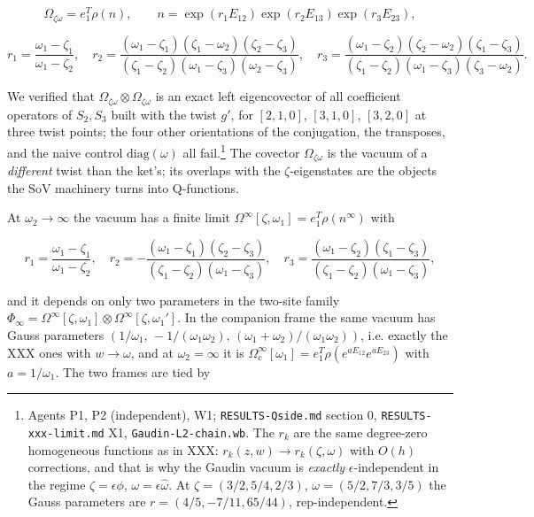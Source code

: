 \documentclass[11pt]{article}
\begin{document}
\begin{equation}
\Omega_{\zeta\omega}=e_1^T\rho(n),\qquad n=\exp(r_1E_{12})\exp(r_2E_{13})\exp(r_3E_{23}),\label{eq:vac}
\end{equation}

\begin{equation}
r_1=\frac{\omega_1-\zeta_1}{\omega_1-\zeta_2},\quad r_2=\frac{(\omega_1-\zeta_1)(\zeta_1-\omega_2)(\zeta_2-\zeta_3)}{(\zeta_1-\zeta_2)(\omega_1-\zeta_3)(\omega_2-\zeta_3)},\quad r_3=\frac{(\omega_1-\zeta_2)(\zeta_2-\omega_2)(\zeta_1-\zeta_3)}{(\zeta_1-\zeta_2)(\omega_1-\zeta_3)(\zeta_3-\omega_2)}.\label{eq:rk}
\end{equation}

We verified that $\Omega_{\zeta\omega}\otimes\Omega_{\zeta\omega}$ is an exact left eigencovector of all coefficient operators of $S_2,S_3$ built with the twist $g'$, for $[2,1,0]$, $[3,1,0]$, $[3,2,0]$ at three twist points; the four other orientations of the conjugation, the transposes, and the naive control $\mathrm{diag}(\omega)$ all fail.\footnote{Agents P1, P2 (independent), W1; \texttt{RESULTS-\allowbreak{}Qside.\allowbreak{}md} section 0, \texttt{RESULTS-\allowbreak{}xxx-\allowbreak{}limit.\allowbreak{}md} X1, \texttt{Gaudin-\allowbreak{}L2-\allowbreak{}chain.\allowbreak{}wb}. The $r_k$ are the same degree-zero homogeneous functions as in XXX: $r_k(z,w)\to r_k(\zeta,\omega)$ with $O(h)$ corrections, and that is why the Gaudin vacuum is \emph{exactly} $\epsilon$-independent in the regime $\zeta=\epsilon\phi$, $\omega=\epsilon\hat\omega$. At $\zeta=(3/2,5/4,2/3)$, $\omega=(5/2,7/3,3/5)$ the Gauss parameters are $r=(4/5,-7/11,65/44)$, rep-independent.} The covector $\Omega_{\zeta\omega}$ is the vacuum of a \emph{different} twist than the ket's; its overlaps with the $\zeta$-eigenstates are the objects the SoV machinery turns into Q-functions.

At $\omega_2\to\infty$ the vacuum has a finite limit $\Omega^\infty[\zeta,\omega_1]=e_1^T\rho(n^\infty)$ with

\begin{equation}
r_1=\frac{\omega_1-\zeta_1}{\omega_1-\zeta_2},\quad r_2=-\frac{(\omega_1-\zeta_1)(\zeta_2-\zeta_3)}{(\zeta_1-\zeta_2)(\omega_1-\zeta_3)},\quad r_3=\frac{(\omega_1-\zeta_2)(\zeta_1-\zeta_3)}{(\zeta_1-\zeta_2)(\omega_1-\zeta_3)},\label{eq:rkinf}
\end{equation}

and it depends on only two parameters in the two-site family $\Phi_\infty=\Omega^\infty[\zeta,\omega_1]\otimes\Omega^\infty[\zeta,\omega_1']$. In the companion frame the same vacuum has Gauss parameters $(1/\omega_1,\,-1/(\omega_1\omega_2),\,(\omega_1+\omega_2)/(\omega_1\omega_2))$, i.e. exactly the XXX ones with $w\to\omega$, and at $\omega_2=\infty$ it is $\Omega_c^\infty[\omega_1]=e_1^T\rho(e^{aE_{12}}e^{aE_{23}})$ with $a=1/\omega_1$. The two frames are tied by
\end{document}
